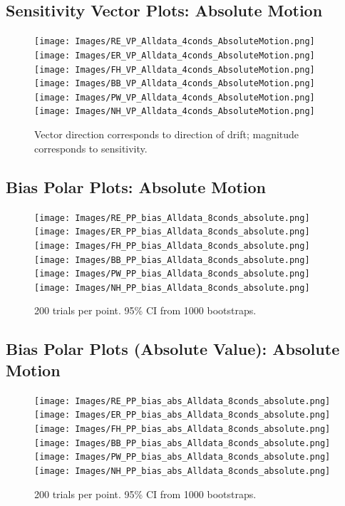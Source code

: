 \documentclass[11pt]{article} %
\begin{document}
\subsection{Sensitivity Vector Plots: Absolute Motion}
\begin{figure}[H]
\centering %
\texttt{[image: Images/RE\_VP\_Alldata\_4conds\_AbsoluteMotion.png]}
\texttt{[image: Images/ER\_VP\_Alldata\_4conds\_AbsoluteMotion.png]}
\texttt{[image: Images/FH\_VP\_Alldata\_4conds\_AbsoluteMotion.png]}
\texttt{[image: Images/BB\_VP\_Alldata\_4conds\_AbsoluteMotion.png]}
\texttt{[image: Images/PW\_VP\_Alldata\_4conds\_AbsoluteMotion.png]}
\texttt{[image: Images/NH\_VP\_Alldata\_4conds\_AbsoluteMotion.png]}
\caption{Vector direction corresponds to direction of drift; magnitude corresponds to sensitivity.}
\end{figure}
\subsection{Bias Polar Plots: Absolute Motion}
\begin{figure}[H]
\centering %
\texttt{[image: Images/RE\_PP\_bias\_Alldata\_8conds\_absolute.png]}
\texttt{[image: Images/ER\_PP\_bias\_Alldata\_8conds\_absolute.png]}
\texttt{[image: Images/FH\_PP\_bias\_Alldata\_8conds\_absolute.png]}
\texttt{[image: Images/BB\_PP\_bias\_Alldata\_8conds\_absolute.png]}
\texttt{[image: Images/PW\_PP\_bias\_Alldata\_8conds\_absolute.png]}
\texttt{[image: Images/NH\_PP\_bias\_Alldata\_8conds\_absolute.png]}
\caption{200 trials per point. 95\% CI from 1000 bootstraps.}
\end{figure}
\subsection{Bias Polar Plots (Absolute Value): Absolute Motion}
\begin{figure}[H]
\centering %
\texttt{[image: Images/RE\_PP\_bias\_abs\_Alldata\_8conds\_absolute.png]}
\texttt{[image: Images/ER\_PP\_bias\_abs\_Alldata\_8conds\_absolute.png]}
\texttt{[image: Images/FH\_PP\_bias\_abs\_Alldata\_8conds\_absolute.png]}
\texttt{[image: Images/BB\_PP\_bias\_abs\_Alldata\_8conds\_absolute.png]}
\texttt{[image: Images/PW\_PP\_bias\_abs\_Alldata\_8conds\_absolute.png]}
\texttt{[image: Images/NH\_PP\_bias\_abs\_Alldata\_8conds\_absolute.png]}
\caption{200 trials per point. 95\% CI from 1000 bootstraps.}
\end{figure}
\end{document}
